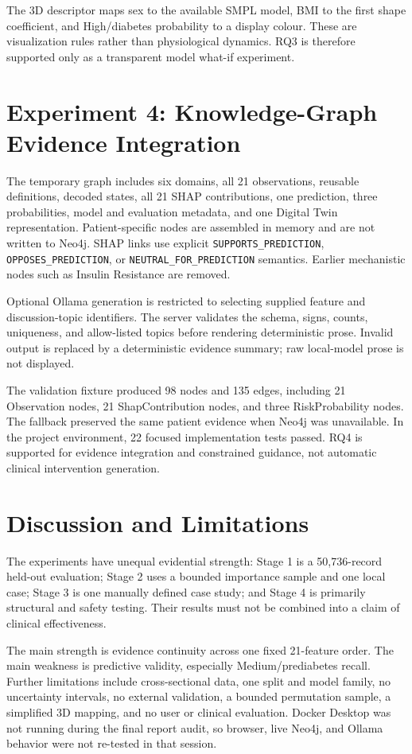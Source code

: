 \documentclass[11pt]{article}
\begin{document}
The 3D descriptor maps sex to the available SMPL model, BMI to the first shape coefficient, and High/diabetes probability to a display colour. These are visualization rules rather than physiological dynamics. RQ3 is therefore supported only as a transparent model what-if experiment.

\section{Experiment 4: Knowledge-Graph Evidence Integration}

The temporary graph includes six domains, all 21 observations, reusable definitions, decoded states, all 21 SHAP contributions, one prediction, three probabilities, model and evaluation metadata, and one Digital Twin representation. Patient-specific nodes are assembled in memory and are not written to Neo4j. SHAP links use explicit \texttt{SUPPORTS\_PREDICTION}, \texttt{OPPOSES\_PREDICTION}, or \texttt{NEUTRAL\_FOR\_PREDICTION} semantics. Earlier mechanistic nodes such as Insulin Resistance are removed.

Optional Ollama generation is restricted to selecting supplied feature and discussion-topic identifiers. The server validates the schema, signs, counts, uniqueness, and allow-listed topics before rendering deterministic prose. Invalid output is replaced by a deterministic evidence summary; raw local-model prose is not displayed.

The validation fixture produced 98 nodes and 135 edges, including 21 Observation nodes, 21 ShapContribution nodes, and three RiskProbability nodes. The fallback preserved the same patient evidence when Neo4j was unavailable. In the project environment, 22 focused implementation tests passed. RQ4 is supported for evidence integration and constrained guidance, not automatic clinical intervention generation.

\section{Discussion and Limitations}

The experiments have unequal evidential strength: Stage 1 is a 50,736-record held-out evaluation; Stage 2 uses a bounded importance sample and one local case; Stage 3 is one manually defined case study; and Stage 4 is primarily structural and safety testing. Their results must not be combined into a claim of clinical effectiveness.

The main strength is evidence continuity across one fixed 21-feature order. The main weakness is predictive validity, especially Medium/prediabetes recall. Further limitations include cross-sectional data, one split and model family, no uncertainty intervals, no external validation, a bounded permutation sample, a simplified 3D mapping, and no user or clinical evaluation. Docker Desktop was not running during the final report audit, so browser, live Neo4j, and Ollama behavior were not re-tested in that session.
\end{document}
